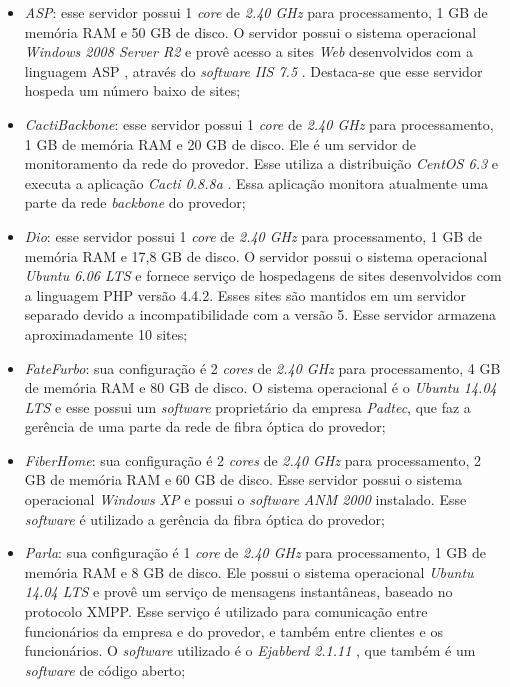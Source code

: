 \begin{itemize}
 \item \textit{ASP}: esse servidor possui 1 \textit{core} de \textit{2.40 GHz} para processamento, 1 GB de memória RAM e 50 GB de disco. 
 O servidor possui o sistema operacional \textit{Windows 2008 Server R2} e provê acesso a sites \textit{Web} desenvolvidos com a linguagem 
 \ac{ASP} \cite{asp}, através do \textit{software} \textit{\ac{IIS} 7.5} \cite{iis}. Destaca-se que esse servidor hospeda um número baixo de sites;
 
 \item \textit{CactiBackbone}: esse servidor possui 1 \textit{core} de \textit{2.40 GHz} para processamento, 1 GB de memória RAM e 20 GB de disco. 
 Ele é um servidor de monitoramento da rede do provedor. Esse utiliza a distribuição \textit{CentOS 6.3} \cite{centos} e executa a aplicação 
 \textit{Cacti 0.8.8a} \cite{cacti}. Essa aplicação monitora atualmente uma parte da rede \textit{backbone} do provedor;
 
 \item \textit{Dio}: esse servidor possui 1 \textit{core} de \textit{2.40 GHz} para processamento, 1 GB de memória RAM e 17,8 GB de disco. 
 O servidor possui o sistema operacional \textit{Ubuntu 6.06 \ac{LTS}} \cite{ubuntu} e fornece serviço de hospedagens de sites desenvolvidos com 
 a linguagem \ac{PHP} versão 4.4.2. Esses sites são mantidos em um servidor separado devido a incompatibilidade com a versão 5. Esse servidor 
 armazena aproximadamente 10 sites;
 
 \item \textit{FateFurbo}: sua configuração é 2 \textit{cores} de \textit{2.40 GHz} para processamento, 4 GB de memória RAM e 80 GB de disco. 
 O sistema operacional é o \textit{Ubuntu 14.04 \ac{LTS}} \cite{ubuntu} e esse possui um \textit{software} proprietário da empresa \textit{Padtec}, 
 que faz a gerência de uma parte da rede de fibra óptica do provedor;
 
 \item \textit{FiberHome}: sua configuração é 2 \textit{cores} de \textit{2.40 GHz} para processamento, 2 GB de memória RAM e 60 GB de disco. 
 Esse servidor possui o sistema operacional \textit{Windows XP} e possui o \textit{software} \textit{ANM 2000} instalado. Esse \textit{software} 
 é utilizado a gerência da fibra óptica do provedor;
 
 \item \textit{Parla}: sua configuração é 1 \textit{core} de \textit{2.40 GHz} para processamento, 1 GB de memória RAM e 8 GB de disco. 
 Ele possui o sistema operacional \textit{Ubuntu 14.04 \ac{LTS}} \cite{ubuntu} e provê um serviço de mensagens instantâneas, baseado no protocolo 
 \ac{XMPP}. Esse serviço é utilizado para comunicação entre funcionários da empresa e do provedor, e também entre clientes e os funcionários. 
 O \textit{software} utilizado é o \textit{Ejabberd 2.1.11} \cite{ejabberd}, que também é um \textit{software} de código aberto;


\end{itemize}
